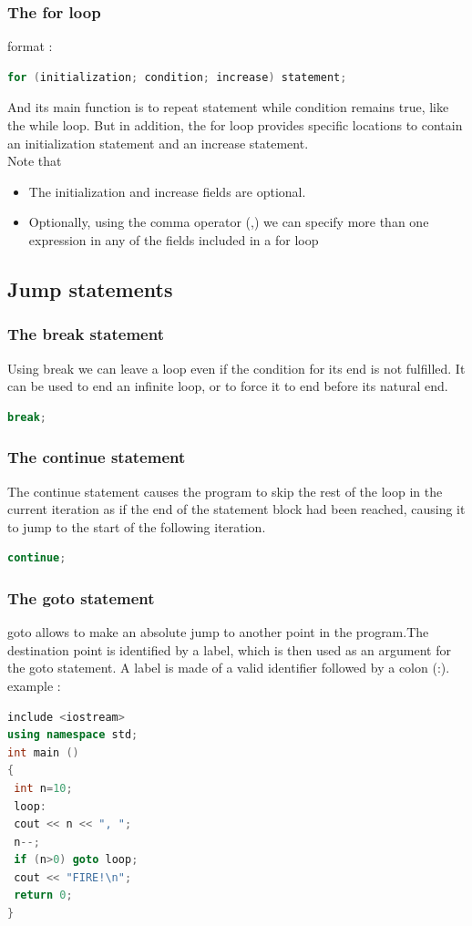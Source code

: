 \documentclass[12pt,oneside]{book}
\begin{document}
\subsubsection{The for loop}
format :
\begin{lstlisting}[language=C++]
    for (initialization; condition; increase) statement;
\end{lstlisting}
And its main function is to repeat statement while condition remains true, like the while loop. But in addition, the for loop provides specific locations to contain an initialization statement and an increase statement.\\
Note that
\begin{itemize}
	\item The initialization and increase fields are optional.
	\item Optionally, using the comma operator (,) we can specify more than one expression in any of the fields included in a for loop
\end{itemize}
\subsection{Jump statements}
\subsubsection{The break statement}
Using break we can leave a loop even if the condition for its end is not fulfilled. It can be used to end an infinite loop, or to force it to end before its natural end.
	\begin{lstlisting}[language=C++]
    break;
\end{lstlisting}
\subsubsection{The continue statement}
The continue statement causes the program to skip the rest of the loop in the current iteration as if the end of the statement block had been reached, causing it to jump to the start of the following iteration.
	\begin{lstlisting}[language=C++]
    continue;
\end{lstlisting}
\subsubsection{The goto statement}
goto allows to make an absolute jump to another point in the program.The destination point is identified by a label, which is then used as an argument for the goto statement. A label is
made of a valid identifier followed by a colon (:).\\
example :
\begin{lstlisting}[language=C++]
include <iostream>
using namespace std; 
int main () 
{ 
 int n=10; 
 loop: 
 cout << n << ", "; 
 n--; 
 if (n>0) goto loop; 
 cout << "FIRE!\n"; 
 return 0; 
} 
\end{lstlisting}
\end{document}
